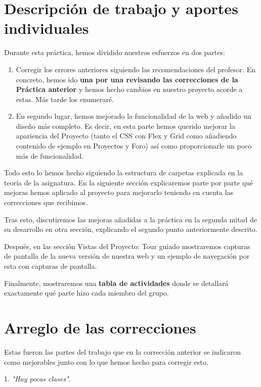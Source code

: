 \documentclass[12pt]{report}
\begin{document}
\section{Descripción de trabajo y aportes individuales}

Durante esta práctica, hemos dividido nuestros esfuerzos en dos partes:

\begin{enumerate}  
\item Corregir los errores anteriores siguiendo las recomendaciones del profesor. En concreto, hemos ido \textbf{una por una revisando las correcciones de la Práctica anterior} y hemos hecho cambios en nuestro proyecto acorde a estas. Más tarde los enumeraré.

\item En segundo lugar, hemos mejorado la funcionalidad de la web y añadido un diseño más completo. Es decir, en esta parte hemos querido mejorar la apariencia del Proyecto (tanto el CSS con Flex y Grid como añadiendo contenido de ejemplo en Proyectos y Foro) así como proporcionarle un poco más de funcionalidad.

\end{enumerate}

Todo esto lo hemos hecho siguiendo la estructura de carpetas explicada en la teoría de la asignatura. En la siguiente sección explicaremos parte por parte qué mejoras hemos aplicado al proyecto para mejorarlo teniendo en cuenta las correcciones que recibimos. 

Tras esto, discutiremos las mejoras añadidas a la práctica en la segunda mitad de su desarrollo en otra sección, explicando el segundo punto anteriormente descrito. 

Después, en las sección Vistas del Proyecto: Tour guiado  mostraremos capturas de pantalla de la nueva versión de nuestra web y un ejemplo de navegación por esta con capturas de pantalla.

Finalmente, mostraremos una \textbf{tabla de actividades} donde se detallará exactamente qué parte hizo cada miembro del grupo.

\section{Arreglo de las correcciones}

Estas fueron las partes del trabajo que en la corrección anterior se indicaron como mejorables junto con lo que hemos hecho para corregir esto.

1. \textit{"Hay pocas clases".}
\end{document}
